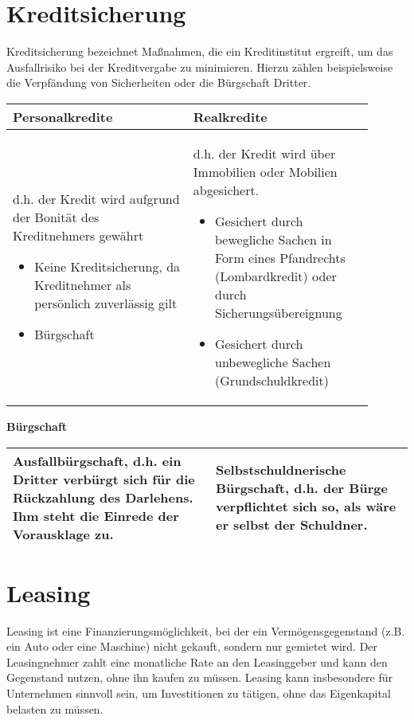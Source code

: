 \documentclass{article}
\begin{document}
\section*{Kreditsicherung}

Kreditsicherung bezeichnet Maßnahmen, die ein Kreditinstitut ergreift, um das
Ausfallrisiko bei der Kreditvergabe zu minimieren. Hierzu zählen beispielsweise
die Verpfändung von Sicherheiten oder die Bürgschaft Dritter.

\begin{table}[!htb]
  \centering
  \begin{tabular}{|p{0.45\linewidth}|p{0.45\linewidth}|}
    \hline
    \textbf{Personalkredite} & \textbf{Realkredite} \\
    \hline
    d.h. der Kredit wird aufgrund der Bonität des Kreditnehmers gewährt
    \begin{itemize}[nosep, leftmargin=*]
      \item Keine Kreditsicherung, da Kreditnehmer als persönlich zuverlässig gilt
      \item Bürgschaft
    \end{itemize} &
    d.h. der Kredit wird über Immobilien oder Mobilien abgesichert.
    \begin{itemize}[nosep, leftmargin=*]
      \item Gesichert durch bewegliche Sachen in Form eines Pfandrechts (Lombardkredit) oder durch Sicherungsübereignung
      \item Gesichert durch unbewegliche Sachen (Grundschuldkredit)
    \end{itemize} \\
    \hline
  \end{tabular}
\end{table}


\begin{table}[!htb]
  \centering
   \textbf{Bürgschaft}
  \begin{tabularx}{\linewidth}{|X|X|}
    \hline
    \textbf{Ausfallbürgschaft}, d.h. ein Dritter verbürgt sich für die Rückzahlung des Darlehens. Ihm steht die Einrede der Vorausklage zu. & \textbf{Selbstschuldnerische Bürgschaft}, d.h. der Bürge verpflichtet sich so, als wäre er selbst der Schuldner. \\
    \hline
  \end{tabularx}
\end{table}


\hrulefill

\section*{Leasing}
Leasing ist eine Finanzierungsmöglichkeit, bei der ein Vermögensgegenstand
(z.B. ein Auto oder eine Maschine) nicht gekauft, sondern nur gemietet wird.
Der Leasingnehmer zahlt eine monatliche Rate an den Leasinggeber und kann den
Gegenstand nutzen, ohne ihn kaufen zu müssen. Leasing kann insbesondere für
Unternehmen sinnvoll sein, um Investitionen zu tätigen, ohne das Eigenkapital
belasten zu müssen.
\end{document}
